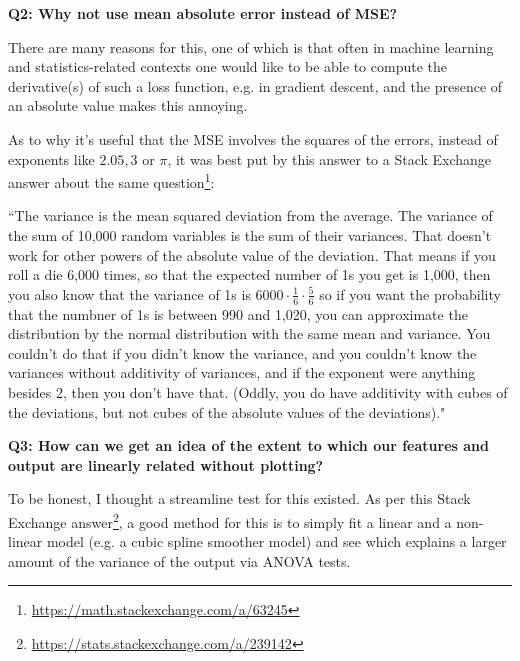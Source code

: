 \documentclass[11pt]{article}
\begin{document}
\begin{tcolorbox}[colback=c2]
\begin{center}
    \textbf{Q2: Why not use mean absolute error instead of MSE?}
\end{center}
\vspace{-8pt}
There are many reasons for this, one of which is that often in machine learning and statistics-related contexts one would like to be able to compute the derivative(s) of such a loss function, e.g. in gradient descent, and the presence of an absolute value makes this annoying.

As to why it's useful that the MSE involves the squares of the errors, instead of exponents like $2.05, 3$ or $\pi$, it was best put by this answer to a Stack Exchange answer about the same question\footnote{\url{https://math.stackexchange.com/a/63245}}:

``The variance is the mean squared deviation from the average. The variance of the sum of 10,000 random variables is the sum of their variances. That doesn't work for other powers of the absolute value of the deviation. That means if you roll a die 6,000 times, so that the expected number of 1s you get is 1,000, then you also know that the variance of 1s is $6000\cdot\frac{1}{6}\cdot\frac{5}{6}$ so if you want the probability that the numbner of 1s is between 990 and 1,020, you can approximate the distribution by the normal distribution with the same mean and variance. You couldn't do that if you didn't know the variance, and you couldn't know the variances without additivity of variances, and if the exponent were anything besides 2, then you don't have that. (Oddly, you do have additivity with cubes of the deviations, but not cubes of the absolute values of the deviations)."
\end{tcolorbox}

\begin{tcolorbox}[colback=c2]
\begin{center}
    \textbf{Q3: How can we get an idea of the extent to which our features and output are linearly related without plotting?}
\end{center}
\vspace{-8pt}
To be honest, I thought a streamline test for this existed. As per this Stack Exchange answer\footnote{\url{https://stats.stackexchange.com/a/239142}}, a good method for this is to simply fit a linear and a non-linear model (e.g. a cubic spline smoother model) and see which explains a larger amount of the variance of the output via ANOVA tests.
\end{tcolorbox}
\end{document}
